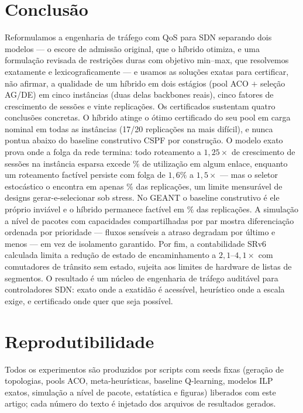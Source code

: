 \documentclass[journal]{IEEEtran}
\begin{document}
\section{Conclusão}
\label{sec:conc}
Reformulamos a engenharia de tráfego com QoS para SDN separando dois
modelos --- o escore de admissão original, que o híbrido otimiza, e uma
formulação revisada de restrições duras com objetivo min--max, que resolvemos
exatamente e lexicograficamente --- e usamos as soluções exatas para
certificar, não afirmar, a qualidade de um híbrido em dois estágios (pool ACO
$+$ seleção AG/DE) em cinco instâncias (duas delas backbones reais), cinco
fatores de crescimento de sessões e vinte replicações. Os certificados
sustentam quatro conclusões concretas. O híbrido atinge o ótimo certificado
do seu pool em carga nominal em todas as instâncias (17/20 replicações na
mais difícil), e nunca pontua abaixo do baseline construtivo CSPF por
construção. O modelo exato prova onde a folga da rede termina: todo
roteamento a $1{,}25\times$ de crescimento de sessões na instância esparsa
excede \IlpZmaiaHighPct\% de utilização em algum enlace, enquanto um
roteamento factível persiste com folga de $1{,}6\%$ a $1{,}5\times$ --- mas
o seletor estocástico o encontra em apenas \GaFeasMaiaMax\% das replicações,
um limite mensurável de designs gerar-e-selecionar sob stress. No GEANT o
baseline construtivo é ele próprio inviável e o híbrido permanece factível
em \AntGaFeas\% das replicações. A simulação a nível de pacotes com
capacidades compartilhadas por par mostra diferenciação ordenada por
prioridade --- fluxos sensíveis a atraso degradam por último e menos --- em
vez de isolamento garantido. Por fim, a contabilidade SRv6 calculada limita a
redução de estado de encaminhamento a $2{,}1$--$4{,}1\times$ com comutadores
de trânsito sem estado, sujeita aos limites de hardware de listas de
segmentos. O resultado é um núcleo de engenharia de tráfego auditável para
controladores SDN: exato onde a exatidão é acessível, heurístico onde a
escala exige, e certificado onde quer que seja possível.

\section*{Reprodutibilidade}
Todos os experimentos são produzidos por scripts com seeds fixas (geração de
topologias, pools ACO, meta-heurísticas, baseline Q-learning, modelos ILP
exatos, simulação a nível de pacote, estatística e figuras) liberados com
este artigo; cada número do texto é injetado dos arquivos de resultados
gerados.
\end{document}
